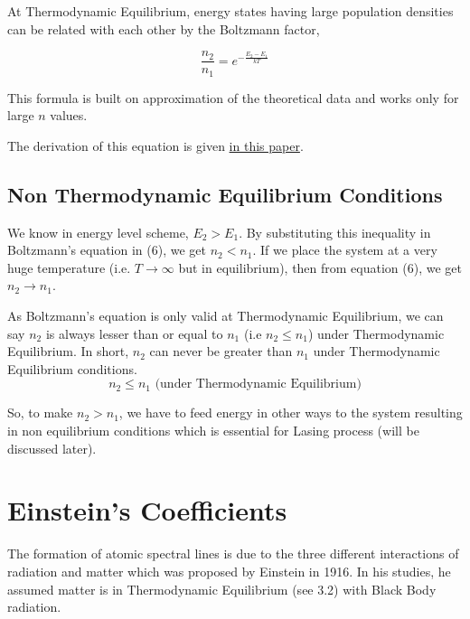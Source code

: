 \documentclass[12pt]{article}
\begin{document}
At Thermodynamic Equilibrium, energy states having large population densities can be related with each other by the Boltzmann factor,

\begin{equation}
    \frac{n_{2}}{n_{1}} = e^{-\frac{E_{2} - E_{1}}{kT}}
\end{equation}

This formula is built on approximation of the theoretical data and works only for large $n$ values. \vspace{.2cm}

The derivation of this equation is given \href{https://www.phys.ufl.edu/~meisel/Boltzmann.pdf}{in this paper}.

\subsection{Non Thermodynamic Equilibrium Conditions}

We know in energy level scheme, $E_{2} > E_{1}$. By substituting this inequality in Boltzmann's equation in (6), we get $n_{2} < n_{1}$. If we place the system at a very huge temperature (i.e. $T \rightarrow \infty$ but in equilibrium), then from equation (6), we get $n_{2} \rightarrow n_{1}$. \vspace{.2cm}

As Boltzmann's equation is only valid at Thermodynamic Equilibrium, we can say $n_{2}$ is always lesser than or equal to $n_{1}$ (i.e $n_{2} \le n_{1}$) under Thermodynamic Equilibrium. In short, $n_{2}$ can never be greater than $n_{1}$ under Thermodynamic Equilibrium conditions. 
\begin{equation*}
    n_{2} \le n_{1} \text{ (under Thermodynamic Equilibrium)}
\end{equation*}

So, to make $n_{2} > n_{1}$, we have to feed energy in other ways to the system resulting in non equilibrium conditions which is essential for Lasing process (will be discussed later). 

\section{Einstein's Coefficients}

The formation of atomic spectral lines is due to the three different interactions of radiation and matter which was proposed by Einstein in 1916. In his studies, he assumed matter is in Thermodynamic Equilibrium (see 3.2) with Black Body radiation. \vspace{.2cm}
\end{document}

